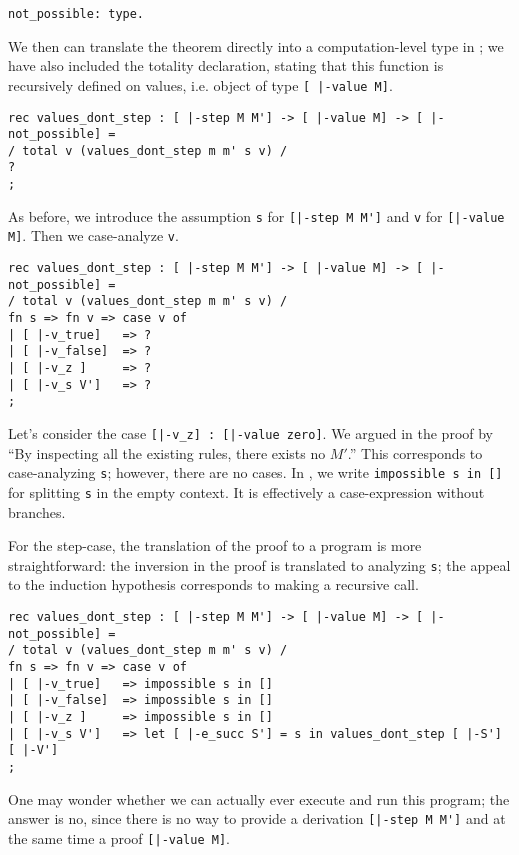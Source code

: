 \begin{lstlisting}
not_possible: type.
\end{lstlisting}

We then can translate the theorem directly into a computation-level type in
\beluga; we have also included the totality declaration, stating that this
function is recursively defined on values, i.e. object of type \lstinline![ |-value M]!.

\begin{lstlisting}
rec values_dont_step : [ |-step M M'] -> [ |-value M] -> [ |-not_possible] =
/ total v (values_dont_step m m' s v) /
?
;
\end{lstlisting}

As before, we introduce the assumption \lstinline!s! for
\lstinline![|-step M M']! and \lstinline!v! for
\lstinline![|-value M]!. Then we case-analyze \lstinline!v!.

\begin{lstlisting}
rec values_dont_step : [ |-step M M'] -> [ |-value M] -> [ |-not_possible] =
/ total v (values_dont_step m m' s v) /
fn s => fn v => case v of
| [ |-v_true]   => ?
| [ |-v_false]  => ?
| [ |-v_z ]     => ?
| [ |-v_s V']   => ?
;
\end{lstlisting}

Let's consider the case \lstinline![|-v_z] : [|-value zero]!. We argued in the
proof by ``By inspecting all the existing rules, there exists no $M'$.'' This
corresponds to case-analyzing \lstinline!s!; however, there are no cases. In
\beluga, we write \lstinline!impossible s in []! for splitting \lstinline!s! in
the empty context. It is effectively a case-expression without branches.

For the step-case, the translation of the proof to a program is more
straightforward: the inversion in the proof is translated to analyzing
\lstinline!s!; the appeal to the induction hypothesis corresponds to making a
recursive call.

\begin{lstlisting}
rec values_dont_step : [ |-step M M'] -> [ |-value M] -> [ |-not_possible] =
/ total v (values_dont_step m m' s v) /
fn s => fn v => case v of
| [ |-v_true]   => impossible s in []
| [ |-v_false]  => impossible s in []
| [ |-v_z ]     => impossible s in []
| [ |-v_s V']   => let [ |-e_succ S'] = s in values_dont_step [ |-S'] [ |-V']
;
\end{lstlisting}

One may wonder whether we can actually ever execute and run this program; the
answer is no, since there is no way to provide a derivation
\lstinline![|-step M M']! and at the same time a proof \lstinline![|-value M]!.


